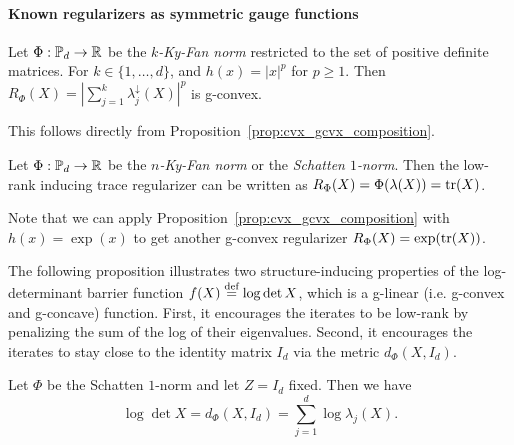 \documentclass[sn-nature]{sn-jnl}%
\theoremstyle{thmstyleone}%
\theoremstyle{thmstyletwo}%
\theoremstyle{thmstylethree}%
\begin{document}

\paragraph{Known regularizers as symmetric gauge functions}

\begin{lemma}
      Let $\Phi:\mathbb{P}_d \to \mathbb{R}$ be the \emph{$k$-Ky-Fan norm} restricted to the set of positive definite matrices. For $k \in \{1, \ldots, d\}$,
    and $h(x) = |x|^p$ for $p \geq 1$. Then
    $R_\Phi(X) = \left | \sum_{j=1}^k \lambda^\downarrow_j(X) \right|^p$
    is g-convex. 
\end{lemma}
This follows directly from Proposition~\ref{prop:cvx_gcvx_composition}.

\begin{prop}
    Let $\Phi:\mathbb{P}_d \to \mathbb{R}$ be the \emph{$n$-Ky-Fan norm} or the \emph{Schatten $1$-norm}. Then the low-rank inducing trace regularizer can be written as $R_\Phi(X)=\Phi(\lambda(X)) = \text{tr}(X)$.
\end{prop}

Note that we can apply Proposition~\ref{prop:cvx_gcvx_composition} with $h(x) = \exp(x)$ to get another g-convex regularizer
    $R_\Phi(X) = \exp(\text{tr}(X))$.

The following proposition illustrates two structure-inducing properties of the log-determinant barrier function $f(X) \stackrel{\text{def}}{=} \log \det X$, which is a g-linear (i.e. g-convex and g-concave) function. First, it encourages the iterates to be low-rank by penalizing the sum of the log of their eigenvalues. Second, it encourages the iterates to stay close to the identity matrix $I_d$ via the metric $d_\Phi(X, I_d)$.
\begin{prop}
     Let $\Phi$ be the Schatten $1$-norm and let $Z= I_d$ fixed. Then we have 
    \[
    \log \det X = d_\Phi(X, I_d)  = \sum_{j=1}^d \log \lambda_j (X).
    \]
\end{prop}
\end{document}
